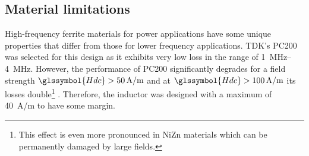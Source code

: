 \documentclass{IPEC2026}
\newcommand{\sbl}[1]{\glssymbol{#1}}
\begin{document}
\subsection{Material limitations}
High-frequency ferrite materials for power applications have some unique properties that differ from those for lower frequency applications. TDK's PC200 was selected for this design as it exhibits very low loss in the range of \qtyrange{1}{4}{\MHz}. However, the performance of PC200 significantly degrades for a field strength $\sbl{Hdc} > \qty{50}{A/m}$ and at $\sbl{Hdc} > \qty{100}{A/m}$ its losses double\footnote{This effect is even more pronounced in NiZn materials which can be permanently damaged by large fields.} \cite{tdkHighFrequencyLowLossFerrite}. Therefore, the inductor was designed with a maximum \sbl{Hdc} of \qty{40}{A/m} to have some margin.
\end{document}
